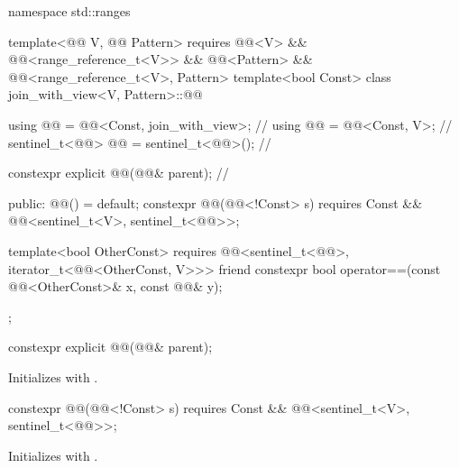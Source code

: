 %
\begin{codeblock}
namespace std::ranges {
  template<@@ V, @@ Pattern>
    requires @@<V> && @@<range_reference_t<V>>
          && @@<Pattern> && @@<range_reference_t<V>, Pattern>
  template<bool Const>
  class join_with_view<V, Pattern>::@@ {
    using @@ = @@<Const, join_with_view>;  // \expos
    using @@ = @@<Const, V>;                 // \expos
    sentinel_t<@@> @@ = sentinel_t<@@>();         // \expos

    constexpr explicit @@(@@& parent);        // \expos

  public:
    @@() = default;
    constexpr @@(@@<!Const> s)
      requires Const && @@<sentinel_t<V>, sentinel_t<@@>>;

    template<bool OtherConst>
      requires @@<sentinel_t<@@>, iterator_t<@@<OtherConst, V>>>
    friend constexpr bool operator==(const @@<OtherConst>& x, const @@& y);
  };
}
\end{codeblock}

%
\begin{itemdecl}
constexpr explicit @@(@@& parent);
\end{itemdecl}

\begin{itemdescr}
\pnum
\effects
Initializes  with .
\end{itemdescr}

%
\begin{itemdecl}
constexpr @@(@@<!Const> s)
  requires Const && @@<sentinel_t<V>, sentinel_t<@@>>;
\end{itemdecl}

\begin{itemdescr}
\pnum
\effects
Initializes  with .
\end{itemdescr}

